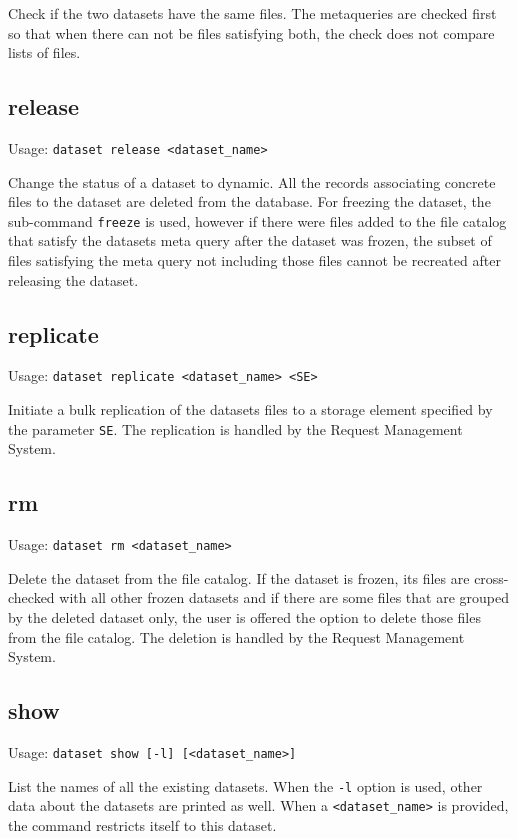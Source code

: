 Check if the two datasets have the same files. The metaqueries are
checked first so that when there can not be files satisfying both,
the check does not compare lists of files.

\subsection{release}

Usage: \texttt{dataset release <dataset\_name>}

Change the status of a dataset to dynamic. All the records
associating concrete files to the dataset are deleted from the
database. For freezing the dataset, the sub-command \texttt{freeze}
is used, however if there were files added to the file catalog that
satisfy the datasets meta query after the dataset was frozen, the
subset of files satisfying the meta query not including those files
cannot be recreated after releasing the dataset.

\subsection{replicate}

Usage: \texttt{dataset replicate <dataset\_name> <SE>}

Initiate a bulk replication of the datasets files to a storage
element specified by the parameter \texttt{SE}. The replication
is handled by the Request Management System.

\subsection{rm}

Usage: \texttt{dataset rm <dataset\_name>}

Delete the dataset from the file catalog. If the dataset is
frozen, its files are cross-checked with all other frozen datasets
and if there are some files that are grouped by the deleted dataset
only, the user is offered the option to delete those files from the
file catalog. The deletion is handled by the Request Management
System.

\subsection{show}

Usage: \texttt{dataset show [-l] [<dataset\_name>]}

List the names of all the existing datasets. When the \texttt{-l}
option is used, other data about the datasets are printed as well.
When a \texttt{<dataset\_name>} is provided, the command restricts
itself to this dataset.

